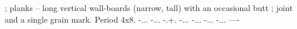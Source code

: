 ; planks -- long vertical wall-boards (narrow, tall) with an occasional butt
; joint and a single grain mark. Period 4x8.
-...
-...
-.+.
-...
-...
-...
-...
----
